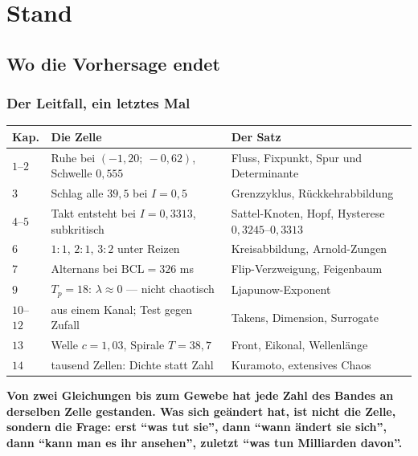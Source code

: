 \part{Stand}

\chapter{Wo die Vorhersage endet}

\section{Der Leitfall, ein letztes Mal}

\begin{merksatz}
\begin{center}
{\small
\renewcommand{\arraystretch}{1.46}
\begin{tabular}{@{}P{1.2cm}P{3.4cm}P{3.8cm}@{}}
\toprule
\textbf{Kap.} & \textbf{Die Zelle} & \textbf{Der Satz}\\
\midrule
$1$--$2$ & Ruhe bei $(-1{,}20;\ -0{,}62)$, Schwelle $0{,}555$ & Fluss, Fixpunkt, Spur und Determinante\\
$3$ & Schlag alle $39{,}5$ bei $I = 0{,}5$ & Grenzzyklus, Rückkehrabbildung\\
$4$--$5$ & Takt entsteht bei $I = 0{,}3313$, subkritisch & Sattel-Knoten, Hopf, Hysterese $0{,}3245$--$0{,}3313$\\
$6$ & $1\!:\!1$, $2\!:\!1$, $3\!:\!2$ unter Reizen & Kreisabbildung, Arnold-Zungen\\
$7$ & Alternans bei $\mathrm{BCL} = 326$ ms & Flip-Verzweigung, Feigenbaum\\
$9$ & $T_p = 18$: $\lambda \approx 0$ --- nicht chaotisch & Ljapunow-Exponent\\
$10$--$12$ & aus einem Kanal; Test gegen Zufall & Takens, Dimension, Surrogate\\
$13$ & Welle $c = 1{,}03$, Spirale $T = 38{,}7$ & Front, Eikonal, Wellenlänge\\
$14$ & tausend Zellen: Dichte statt Zahl & Kuramoto, extensives Chaos\\
\bottomrule
\end{tabular}}
\end{center}

\begin{center}
\begin{minipage}{0.9\textwidth}
\textbf{Von zwei Gleichungen bis zum Gewebe hat jede Zahl des Bandes an derselben Zelle gestanden. Was sich geändert hat, ist nicht die Zelle, sondern die Frage: erst \enquote{was tut sie}, dann \enquote{wann ändert sie sich}, dann \enquote{kann man es ihr ansehen}, zuletzt \enquote{was tun Milliarden davon}.}
\end{minipage}
\end{center}
\end{merksatz}

